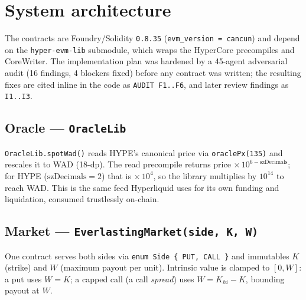 \documentclass[11pt]{article}
\newcommand{\code}[1]{\texttt{\small #1}}
\begin{document}
\section{System architecture}\label{sec:arch}

The contracts are Foundry/Solidity \code{0.8.35} (\code{evm\_version = cancun}) and depend on the
\code{hyper-evm-lib} submodule, which wraps the HyperCore precompiles and CoreWriter. The
implementation plan was hardened by a 45-agent adversarial audit (16 findings, 4 blockers fixed)
before any contract was written; the resulting fixes are cited inline in the code as
\code{AUDIT F1..F6}, and later review findings as \code{I1..I3}.

\subsection{Oracle --- \code{OracleLib}}
\code{OracleLib.spotWad()} reads HYPE's canonical price via \code{oraclePx(135)} and rescales it to
WAD (18-dp). The read precompile returns price $\times\,10^{6-\text{szDecimals}}$; for HYPE
($\text{szDecimals}=2$) that is $\times\,10^{4}$, so the library multiplies by $10^{14}$ to reach
WAD. This is the same feed Hyperliquid uses for its own funding and liquidation, consumed
trustlessly on-chain.

\subsection{Market --- \code{EverlastingMarket(side, K, W)}}
One contract serves both sides via \code{enum Side \{ PUT, CALL \}} and immutables $K$ (strike) and
$W$ (maximum payout per unit). Intrinsic value is clamped to $[0, W]$: a put uses $W = K$; a capped
call (a call \emph{spread}) uses $W = K_{hi}-K$, bounding payout at $W$.
\end{document}
